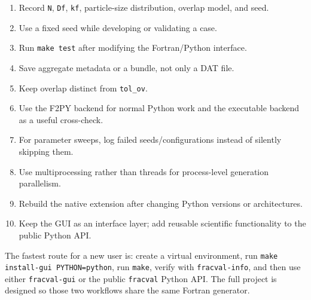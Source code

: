 \documentclass[11pt,oneside]{report}
\newcommand{\code}[1]{\texttt{#1}}
\begin{document}
\begin{enumerate}
  \item Record \code{N}, \code{Df}, \code{kf}, particle-size distribution, overlap model, and seed.
  \item Use a fixed seed while developing or validating a case.
  \item Run \code{make test} after modifying the Fortran/Python interface.
  \item Save aggregate metadata or a bundle, not only a DAT file.
  \item Keep overlap distinct from \code{tol\_ov}.
  \item Use the F2PY backend for normal Python work and the executable backend as a useful cross-check.
  \item For parameter sweeps, log failed seeds/configurations instead of silently skipping them.
  \item Use multiprocessing rather than threads for process-level generation parallelism.
  \item Rebuild the native extension after changing Python versions or architectures.
  \item Keep the GUI as an interface layer; add reusable scientific functionality to the public Python API.
\end{enumerate}

\begin{tipbox}
The fastest route for a new user is: create a virtual environment, run
\code{make install-gui PYTHON=python}, run \code{make}, verify with
\code{fracval-info}, and then use either \code{fracval-gui} or the public
\code{fracval} Python API. The full project is designed so those two workflows
share the same Fortran generator.
\end{tipbox}
\end{document}
